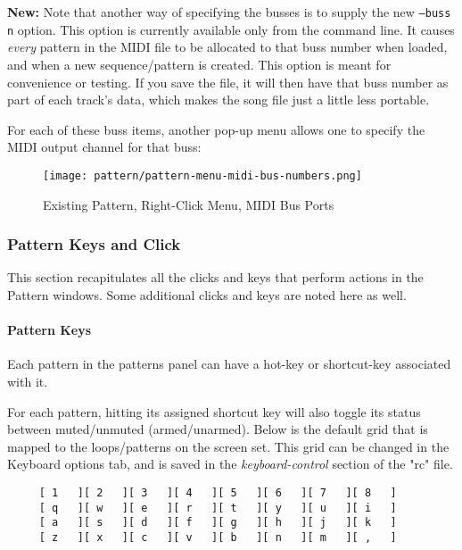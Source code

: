    \textbf{New:}
   Note that another way of specifying the busses is to supply the
   new \texttt{--buss n} option.  This option is currently available
   only from the command line.  It causes \textsl{every} pattern in the MIDI
   file to be allocated to that buss number when loaded, and when a new
   sequence/pattern is created.  This option is
   meant for convenience or testing.  If you save the file, it will then
   have that buss number as part of each track's data, which makes the song
   file just a little less portable.

   For each of these buss items, another pop-up menu allows one
   to specify the MIDI output channel for that buss:

\begin{figure}[H]
   \centering 
   \texttt{[image: pattern/pattern-menu-midi-bus-numbers.png]}
   \caption{Existing Pattern, Right-Click Menu, MIDI Bus Ports}
   \label{fig:pattern_window_right_click_midi_bus_numbers}
\end{figure}

\subsubsection{Pattern Keys and Click}
\label{subsubsec:seq64_patterns_pattern_keys_and_clicks}

   This section recapitulates all the clicks and keys that perform actions
   in the Pattern windows.  Some additional clicks and keys are noted here
   as well.

\paragraph{Pattern Keys}
\label{paragraph:seq64_patterns_pattern_keys}

   Each pattern in the patterns panel can have a hot-key or shortcut-key
   associated with it.

   For each pattern, hitting its assigned shortcut key will
   also toggle its status between muted/unmuted (armed/unarmed).
   Below is the default grid that is
   mapped to the loops/patterns on the screen set.
   This grid can be changed in the Keyboard options tab, and is
   saved in the \textsl{keyboard-control} section of the
   "rc" file.

   \begin{verbatim}
     [ 1   ][ 2   ][ 3   ][ 4   ][ 5   ][ 6   ][ 7   ][ 8   ]
     [ q   ][ w   ][ e   ][ r   ][ t   ][ y   ][ u   ][ i   ]
     [ a   ][ s   ][ d   ][ f   ][ g   ][ h   ][ j   ][ k   ]
     [ z   ][ x   ][ c   ][ v   ][ b   ][ n   ][ m   ][ ,   ]
   \end{verbatim}

